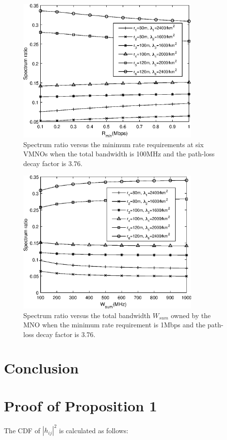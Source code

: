 \documentclass[journal]{IEEEtran}
\begin{document}
\begin{figure}
	\centering
	\includegraphics[width=3.6in]{SR_rmin.eps}
	\caption{Spectrum ratio versus the minimum rate requirements at six VMNOs when the total bandwidth is 100MHz and the path-loss decay factor is 3.76.}
\end{figure}


\begin{figure}
	\centering
	\includegraphics[width=3.6in]{SR_wsum.eps}
	\caption{Spectrum ratio versus  the total bandwidth $W_{sum}$ owned by the MNO when the minimum rate requirement is 1Mbps and the path-loss decay factor is 3.76.}
\end{figure}

\section{Conclusion}

\appendices
\section{Proof of Proposition 1}
The CDF of $\left|h_{ij} \right|^2$ is calculated as follows:
\end{document}
